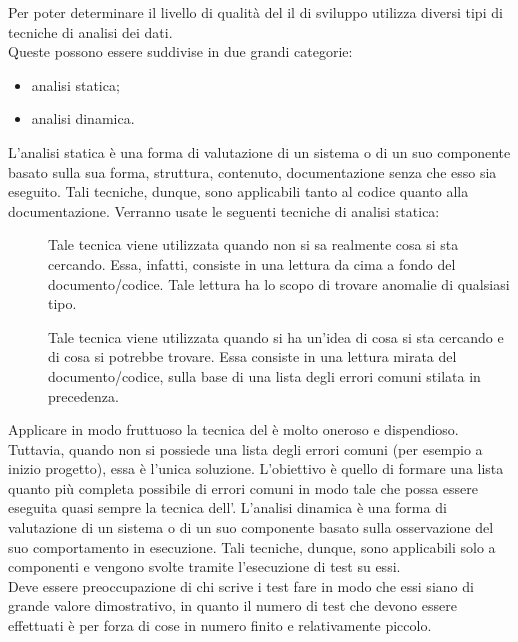 			Per poter determinare il livello di qualità del  il  di sviluppo utilizza diversi tipi di tecniche di analisi dei dati.\\
			Queste possono essere suddivise in due grandi categorie:
			\begin{itemize}
				\item analisi statica;
				\item analisi dinamica.
			\end{itemize}
				L'analisi statica è una forma di valutazione di un sistema o di un suo componente basato sulla sua forma, struttura, contenuto, documentazione senza che esso sia eseguito. Tali tecniche, dunque, sono applicabili tanto al codice quanto alla documentazione.
				Verranno usate le seguenti tecniche di analisi statica:
				\begin{description}
					\item[] Tale tecnica viene utilizzata quando non si sa realmente cosa si sta cercando. Essa, infatti, consiste in una lettura da cima a fondo del documento/codice. Tale lettura ha lo scopo di trovare anomalie di qualsiasi tipo.
					\item[] Tale tecnica viene utilizzata quando si ha un'idea di cosa si sta cercando e di cosa si potrebbe trovare. Essa consiste in una lettura mirata del documento/codice, sulla base di una lista degli errori comuni stilata in precedenza.
				\end{description}
				Applicare in modo fruttuoso la tecnica del  è molto oneroso e dispendioso. Tuttavia, quando non si possiede una lista degli	errori comuni (per esempio a inizio progetto), essa è l'unica soluzione. L'obiettivo è quello di formare una lista quanto più completa possibile di errori comuni in modo tale che possa essere eseguita quasi sempre la tecnica dell'.
				L'analisi dinamica è una forma di valutazione di un sistema  o di un suo componente basato sulla osservazione del suo comportamento in esecuzione. Tali tecniche, dunque, sono applicabili solo a componenti  e vengono svolte tramite l'esecuzione di test su essi.\\
				Deve essere preoccupazione di chi scrive i test fare in modo che essi siano di grande valore dimostrativo, in quanto il numero di test che devono essere effettuati è per forza di cose in numero finito e relativamente piccolo.
